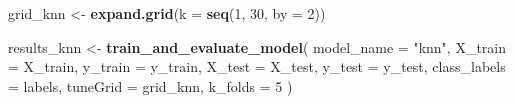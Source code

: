 \documentclass[
]{article}
\newenvironment{Shaded}{\begin{snugshade}}{\end{snugshade}}
\newcommand{\AttributeTok}[1]{\textcolor[rgb]{0.13,0.29,0.53}{#1}}
\newcommand{\DecValTok}[1]{\textcolor[rgb]{0.00,0.00,0.81}{#1}}
\newcommand{\FunctionTok}[1]{\textcolor[rgb]{0.13,0.29,0.53}{\textbf{#1}}}
\newcommand{\NormalTok}[1]{#1}
\newcommand{\OtherTok}[1]{\textcolor[rgb]{0.56,0.35,0.01}{#1}}
\newcommand{\StringTok}[1]{\textcolor[rgb]{0.31,0.60,0.02}{#1}}
\begin{document}
\begin{Shaded}
\begin{Highlighting}[]
\NormalTok{grid\_knn }\OtherTok{\textless{}{-}} \FunctionTok{expand.grid}\NormalTok{(}\AttributeTok{k =} \FunctionTok{seq}\NormalTok{(}\DecValTok{1}\NormalTok{, }\DecValTok{30}\NormalTok{, }\AttributeTok{by =} \DecValTok{2}\NormalTok{))  }

\NormalTok{results\_knn }\OtherTok{\textless{}{-}} \FunctionTok{train\_and\_evaluate\_model}\NormalTok{(}
  \AttributeTok{model\_name =} \StringTok{"knn"}\NormalTok{,}
  \AttributeTok{X\_train =}\NormalTok{ X\_train, }
  \AttributeTok{y\_train =}\NormalTok{ y\_train,}
  \AttributeTok{X\_test =}\NormalTok{ X\_test, }
  \AttributeTok{y\_test =}\NormalTok{ y\_test,}
  \AttributeTok{class\_labels =}\NormalTok{ labels,}
  \AttributeTok{tuneGrid =}\NormalTok{ grid\_knn,}
  \AttributeTok{k\_folds =} \DecValTok{5}
\NormalTok{)}
\end{Highlighting}
\end{Shaded}
\end{document}
